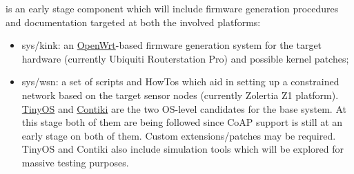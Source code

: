 \href{https://github.com/koanlogic/webthings/tree/master/sys}{} is an early stage component which will include firmware generation procedures and documentation targeted at both the involved platforms:
\begin{itemize}
\item sys/kink: an \href{http://openwrt.org}{OpenWrt}-based firmware generation system for the target hardware (currently Ubiquiti Routerstation Pro) and possible kernel patches;
\item sys/wsn: a set of scripts and HowTos which aid in setting up a constrained network based on the target sensor nodes (currently Zolertia Z1 platform). \href{http://www.tinyos.net}{TinyOS} and \href{http://www.contiki-os.org}{Contiki} are the two OS-level candidates for the base system. At this stage both of them are being followed since CoAP support is still at an early stage on both of them. Custom extensions/patches may be required. TinyOS and Contiki also include simulation tools which will be explored for massive testing purposes.
\end{itemize}
